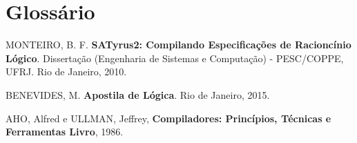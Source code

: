 \documentclass[12pt]{satyrus}
\begin{document}
    \chapter*{Glossário}
    
    \begin{thebibliography}{20}
    	 MONTEIRO, B. F. \textbf{SATyrus2: Compilando Especificações de Racioncínio Lógico}. Dissertação (Engenharia de Sistemas e Computação) - PESC/COPPE, UFRJ. Rio de Janeiro, 2010.
    	
    	 BENEVIDES, M. \textbf{Apostila de Lógica}. Rio de Janeiro, 2015.
    	
    	 AHO, Alfred e ULLMAN, Jeffrey, \textbf{Compiladores: Princípios, Técnicas e Ferramentas
    	Livro}, 1986. 
    \end{thebibliography}
    
\end{document}
